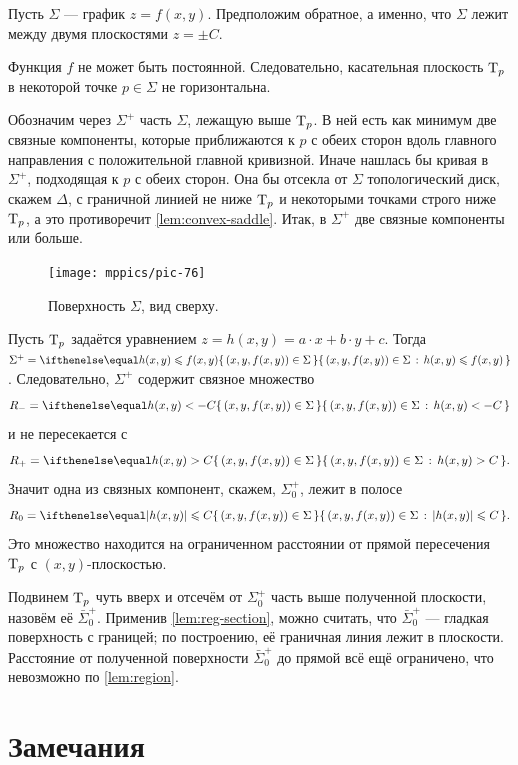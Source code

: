 
Пусть $\Sigma$ --- график $z=f(x,y)$.
Предположим обратное, а именно, что $\Sigma$ лежит между двумя плоскостями $z=\pm C$. 

Функция $f$ не может быть постоянной.
Следовательно, касательная плоскость $\mathrm{T}_p$ в некоторой точке $p\in\Sigma$ не горизонтальна.

Обозначим через $\Sigma^+$ часть $\Sigma$, лежащую выше $\mathrm{T}_p$.
В ней есть как минимум две связные компоненты, которые приближаются к $p$ с обеих сторон 
вдоль главного направления с положительной главной кривизной.
Иначе нашлась бы кривая в $\Sigma^+$, подходящая к $p$ с обеих сторон.
Она бы отсекла от $\Sigma$ топологический диск, скажем $\Delta$, с граничной линией не ниже $\mathrm{T}_p$ и некоторыми точками строго ниже $\mathrm{T}_p$,
а это противоречит \ref{lem:convex-saddle}. 
Итак, в $\Sigma^+$ две связные компоненты или больше.

\begin{figure}[!ht]
\vskip-1mm
\centering
\texttt{[image: mppics/pic-76]}
\caption*{Поверхность $\Sigma$, вид сверху.}
\vskip0mm
\end{figure}

Пусть $\mathrm{T}_p$ задаётся уравнением $z=h(x,y)=a\cdot x+b\cdot y+c$.
Тогда $\Sigma^{+} = \set{(x,y,f(x,y))\in \Sigma}{h(x,y) \leq f(x,y)}$.
Следовательно, $\Sigma^{+}$ содержит связное множество
\[R_-=\set{(x,y,f(x,y))\in\Sigma}{h(x,y)< -C}\] 
и не пересекается с  
\[R_+=\set{(x,y,f(x,y))\in\Sigma}{h(x,y)> C} . \]
Значит одна из связных компонент, скажем, $\Sigma^+_0$, лежит в полосе
\[R_0=\set{(x,y,f(x,y))\in\Sigma}{|h(x,y)|\le  C}.\]
Это множество находится на ограниченном расстоянии от прямой пересечения $\mathrm{T}_p$ с $(x,y)$-плоскостью.

Подвинем $\mathrm{T}_p$ чуть вверх и отсечём от $\Sigma^+_0$ часть выше полученной плоскости, назовём её $\bar\Sigma^+_0$.
Применив \ref{lem:reg-section},
можно считать, что $\bar\Sigma^+_0$ --- гладкая поверхность с границей;
по построению, её граничная линия лежит в плоскости.
Расстояние от полученной поверхности $\bar\Sigma^+_0$ до прямой всё ещё ограничено,
что невозможно по \ref{lem:region}.
\qeds


\section{Замечания}

